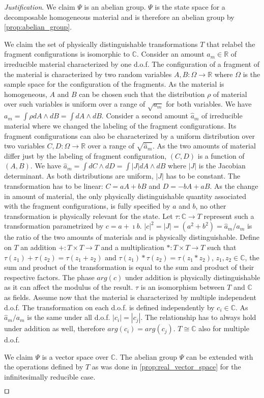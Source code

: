 \documentclass[smallextended]{svjour3}
\numberwithin{equation}{section}
\newenvironment{justification}{\emph{Justification}.}{\hfill\(\qed\)}
\begin{document}
\begin{justification}
	We claim $\Psi$ is an abelian group. $\Psi$ is the state space for a decomposable homogeneous material and is therefore an abelian group  by \ref{prop:abelian_group}.
	
	We claim the set of physically distinguishable transformations $T$ that relabel the fragment configurations is isomorphic to $\mathbb{C}$. Consider an amount $a_m \in \mathbb{R}$ of irreducible material characterized by one d.o.f. The configuration of a fragment of the material is characterized by two random variables $A, B: \Omega \rightarrow \mathbb{R}$ where $\Omega$ is the sample space for the configuration of the fragments. As the material is homogeneous, $A$ and $B$ can be chosen such that the distribution $\rho$ of material over such variables is uniform over a range of $\sqrt{a_m}$ for both variables. We have $a_m=\int \rho dA \wedge dB = \int dA \wedge dB$. Consider a second amount $\hat{a}_m$ of irreducible material where we changed the labeling of the fragment configurations. Its fragment configurations can also be characterized by a uniform distribution over two variables $C, D: \Omega \rightarrow \mathbb{R}$ over a range of $\sqrt{\hat{a}_m}$. As the two amounts of material differ just by the labeling of fragment configuration, $(C,D)$ is a function of $(A,B)$. We have $\hat{a}_m = \int dC \wedge dD = \int |J| dA \wedge dB$ where $|J|$ is the Jacobian determinant. As both distributions are uniform, $|J|$ has to be constant. The transformation has to be linear: $C=aA + bB$ and $D=-bA + aB$. As the change in amount of material, the only physically distinguishable quantity associated with the fragment configurations, is fully specified by $a$ and $b$, no other transformation is physically relevant for the state. Let $\tau: \mathbb{C} \rightarrow T$ represent such a transformation parametrized by $c=a+\imath b$. $|c|^2 = |J| = (a^2 + b^2) = \hat{a}_m / a_m$ is the ratio of the two amounts of materials and is physically distinguishable. Define on $T$ an addition $+: T \times T \rightarrow T$ and a multiplication $*: T \times T \rightarrow T$ such that $\tau(z_1) + \tau(z_2) = \tau(z_1+z_2)$ and $\tau(z_1) * \tau(z_2) = \tau(z_1*z_2)$, $z_1,z_2 \in \mathbb{C}$, the sum and product of the transformation is equal to the sum and product of their respective factors. The phase $arg(c)$ under addition is physically distinguishable as it can affect the modulus of the result. $\tau$ is an isomorphism between $T$ and $\mathbb{C}$ as fields. Assume now that the material is characterized by multiple independent d.o.f. The transformation on each d.o.f. is defined independently by $c_i \in \mathbb{C}$. As $\hat{a}_m / a_m$ is the same under all d.o.f. $|c_i|=|c_j|$. The relationship has to always hold under addition as well, therefore $arg(c_i) = arg(c_j)$. $T\cong \mathbb{C}$ also for multiple d.o.f.

	We claim $\Psi$ is a vector space over $\mathbb{C}$. The abelian group $\Psi$ can be extended with the operations defined by $T$ as was done in \ref{prop:real_vector_space} for the infinitesimally reducible case.
	
\end{justification}
\end{document}
